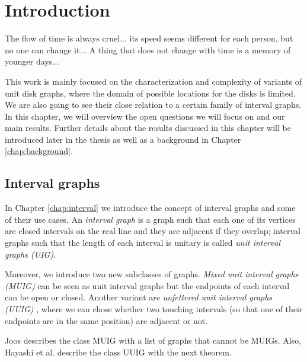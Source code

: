 \newtheorem*{_lemma}{Lemma}
\newtheorem*{_obs}{Observation}
\newtheorem*{_theo}{Theorem}

\chapter{Introduction}

\begin{fquote}
  The flow of time is always cruel... its speed seems different for each person, but no one can change it... A thing that does not change with time is a memory of younger days...
\end{fquote}

This work is mainly focused on the characterization and complexity of variants of unit disk graphs, where the domain of possible locations for the disks is limited. We are also going to see their close relation to a certain family of interval graphs. In this chapter, we will overview the open questions we will focus on and our main results. Further details about the results discussed in this chapter will be introduced later in the thesis as well as a background in Chapter \ref{chap:background}.

\section*{Interval graphs}

In Chapter \ref{chap:interval} we introduce the concept of interval graphs and some of their use cases. An \emph{interval graph} is a graph such that each one of its vertices are closed intervals on the real line and they are adjacent if they overlap; interval graphs such that the length of each interval is unitary is called \emph{unit interval graphs (UIG)}.

Moreover, we introduce two new subclasses of graphs. \emph{Mixed unit interval graphs (MUIG)} \cite{joosCharacterizationMixedUnit2013} can be seen as unit interval graphs but the endpoints of each interval can be open or closed. Another variant are \emph{unfettered unit interval graphs (UUIG)} \cite{hayashiThinStripGraphs2017}, where we can chose whether two touching intervals (so that one of their endpoints are in the same position) are adjacent or not.

Joos describes the class MUIG \cite{joosCharacterizationMixedUnit2013} with a list of graphs that cannot be MUIGs. Also, Hayashi et al. describe the class UUIG with the next theorem.


